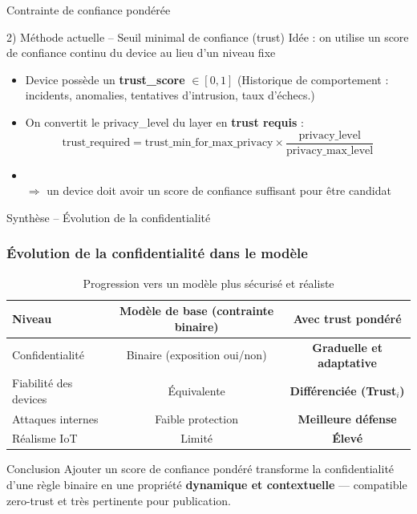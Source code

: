 \documentclass[aspectratio=169]{beamer}
\begin{document}
\begin{frame}{Contrainte de confiance pondérée}
    \begin{block}{2) Méthode actuelle – Seuil minimal de confiance (trust)}
    Idée : on utilise un score de confiance continu du device au lieu d’un niveau fixe
    \begin{itemize}
        \item Device possède un \textbf{trust\_score} $\in [0, 1]$ (Historique de comportement : incidents, anomalies, tentatives d’intrusion, taux d’échecs.)
        \item On convertit le privacy\_level du layer en \textbf{trust requis} :
        \[
        \text{trust\_required} = \text{trust\_min\_for\_max\_privacy} \times \frac{\text{privacy\_level}}{\text{privacy\_max\_level}}
        \]
        \item {} \ge {} \\
        $\Rightarrow$ un device doit avoir un score de confiance suffisant pour être candidat
    \end{itemize}
    \end{block}
\end{frame}
\begin{frame}{Synthèse – Évolution de la confidentialité}
\frametitle{Évolution de la confidentialité dans le modèle}

\begin{table}[!h]
\footnotesize
\centering
\renewcommand{\arraystretch}{1.4}
\begin{tabular}{lcc}
\toprule
Niveau & Modèle de base (contrainte binaire) & Avec trust pondéré \\
\midrule
Confidentialité & Binaire (exposition oui/non) & \textbf{Graduelle et adaptative} \\
Fiabilité des devices & Équivalente & \textbf{Différenciée (Trust$_i$)} \\
Attaques internes & Faible protection & \textbf{Meilleure défense} \\
Réalisme IoT & Limité & \textbf{Élevé} \\
\bottomrule
\end{tabular}
\caption{Progression vers un modèle plus sécurisé et réaliste}
\end{table}

\small
\begin{block}{Conclusion}
Ajouter un score de confiance pondéré transforme la confidentialité d’une règle binaire en une propriété \textbf{dynamique et contextuelle} — compatible zero-trust et très pertinente pour publication.
\end{block}
\end{frame}
\end{document}
